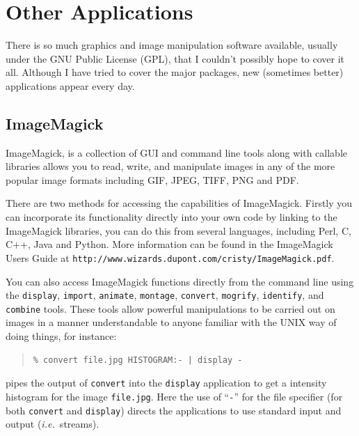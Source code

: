 \documentclass[twoside,11pt]{article}
\newcommand{\htmladdnormallink}[2]{#1}
\newcommand{\latex}[1]{#1}
\newcommand{\xlabel}[1]{}
\begin{document}
\section{\xlabel{sc15_applications}Other Applications\label{sc15_applications}}

There is so much graphics and image manipulation software available, usually under the \htmladdnormallink{GNU Public License}{http://www.gnu.org/copyleft/gpl.html} (GPL), that I couldn't possibly hope to cover it all. Although I have tried to cover the major packages, new (sometimes better) applications appear every day. 

\subsection{\xlabel{sc15_magick}ImageMagick\label{sc15_magick}}

\htmladdnormallink{ImageMagick}{http://www.wizards.dupont.com/cristy/ImageMagick.html}, is a collection of GUI and command line tools along with callable  libraries allows you to read, write, and manipulate images in any of the more popular image formats including GIF, JPEG, TIFF, PNG and PDF.  

There are two methods for accessing the capabilities of ImageMagick. Firstly you can incorporate its functionality directly into your own code by linking to the ImageMagick libraries, you can do this from several languages, including Perl, C, C++, Java and Python. More information can be found in the \htmladdnormallink{ImageMagick Users Guide}{http://www.wizards.dupont.com/cristy/ImageMagick.pdf} \latex{at {\tt http://www.wizards.dupont.com/cristy/ImageMagick.pdf}}.

You can also access ImageMagick functions directly from the command line using the {\tt display}, {\tt import}, {\tt animate}, {\tt montage}, {\tt convert}, {\tt mogrify}, {\tt identify}, and {\tt combine} tools. These tools allow powerful manipulations to be carried out on images in a manner understandable to anyone familiar with the UNIX way of doing things, for instance:

\small
\begin{quote}
\begin{verbatim}
% convert file.jpg HISTOGRAM:- | display -
\end{verbatim}
\end{quote}
\normalsize

pipes the output of {\tt convert} into the {\tt display} application to get a intensity histogram for the image {\tt file.jpg}. Here the use of ``\verb+-+'' for the file specifier (for both {\tt convert} and {\tt display}) directs the applications to use standard input and output ({\em i.e.\ }streams).
    
\end{document}

